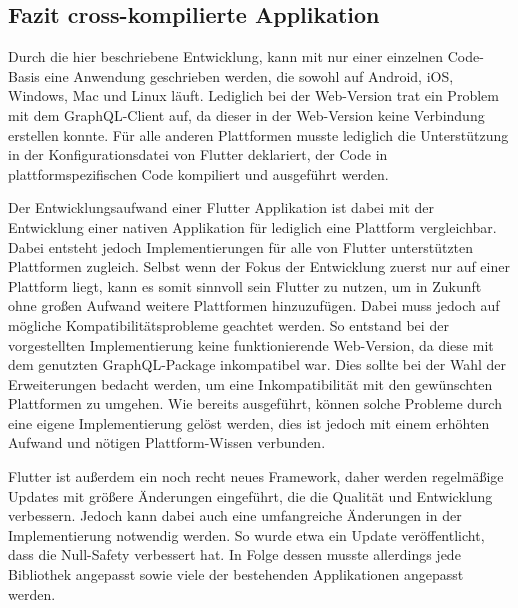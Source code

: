 \subsection{Fazit cross-kompilierte Applikation}
Durch die hier beschriebene Entwicklung, kann mit nur einer einzelnen Code-Basis eine Anwendung geschrieben werden, die sowohl auf Android, iOS, Windows, Mac und Linux läuft. Lediglich bei der Web-Version trat ein Problem mit dem GraphQL-Client auf, da dieser in der Web-Version keine Verbindung erstellen konnte. Für alle anderen Plattformen musste lediglich die Unterstützung in der Konfigurationsdatei von Flutter deklariert, der Code in plattformspezifischen Code kompiliert und ausgeführt werden.

Der Entwicklungsaufwand einer Flutter Applikation ist dabei mit der Entwicklung einer nativen Applikation für lediglich eine Plattform vergleichbar. Dabei entsteht jedoch Implementierungen für alle von Flutter unterstützten Plattformen zugleich. Selbst wenn der Fokus der Entwicklung zuerst nur auf einer Plattform liegt, kann es somit sinnvoll sein Flutter zu nutzen, um in Zukunft ohne großen Aufwand weitere Plattformen hinzuzufügen.
Dabei muss jedoch auf mögliche Kompatibilitätsprobleme geachtet werden. So entstand bei der vorgestellten Implementierung keine funktionierende Web-Version, da diese mit dem genutzten GraphQL-Package inkompatibel war.
Dies sollte bei der Wahl der Erweiterungen bedacht werden, um eine Inkompatibilität mit den gewünschten Plattformen zu umgehen. 
Wie bereits ausgeführt, können solche Probleme durch eine eigene Implementierung gelöst werden, dies ist jedoch mit einem erhöhten Aufwand und nötigen Plattform-Wissen verbunden.

Flutter ist außerdem ein noch recht neues Framework, daher werden regelmäßige Updates mit größere Änderungen eingeführt, die die Qualität und Entwicklung verbessern. Jedoch kann dabei auch eine umfangreiche Änderungen in der Implementierung notwendig werden. So wurde etwa ein Update veröffentlicht, dass die Null-Safety verbessert hat. In Folge dessen musste allerdings jede Bibliothek angepasst sowie viele der bestehenden Applikationen angepasst werden.